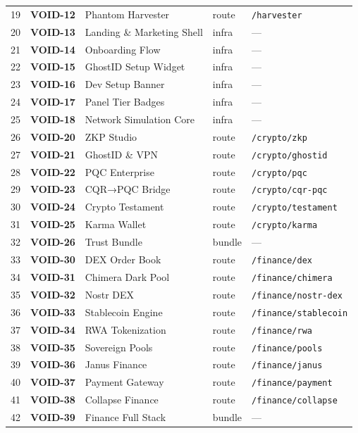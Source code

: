 \documentclass[10pt,a4paper,landscape]{article}
\begin{document}
\begin{longtable}{@{}rl p{4.2cm} p{1.4cm} p{3.8cm}@{}}
19 & \textbf{VOID-12} & Phantom Harvester & route & \texttt{/harvester} \\
20 & \textbf{VOID-13} & Landing \& Marketing Shell & infra & — \\
21 & \textbf{VOID-14} & Onboarding Flow & infra & — \\
22 & \textbf{VOID-15} & GhostID Setup Widget & infra & — \\
23 & \textbf{VOID-16} & Dev Setup Banner & infra & — \\
24 & \textbf{VOID-17} & Panel Tier Badges & infra & — \\
25 & \textbf{VOID-18} & Network Simulation Core & infra & — \\
26 & \textbf{VOID-20} & ZKP Studio & route & \texttt{/crypto/zkp} \\
27 & \textbf{VOID-21} & GhostID \& VPN & route & \texttt{/crypto/ghostid} \\
28 & \textbf{VOID-22} & PQC Enterprise & route & \texttt{/crypto/pqc} \\
29 & \textbf{VOID-23} & CQR→PQC Bridge & route & \texttt{/crypto/cqr-pqc} \\
30 & \textbf{VOID-24} & Crypto Testament & route & \texttt{/crypto/testament} \\
31 & \textbf{VOID-25} & Karma Wallet & route & \texttt{/crypto/karma} \\
32 & \textbf{VOID-26} & Trust Bundle & bundle & — \\
33 & \textbf{VOID-30} & DEX Order Book & route & \texttt{/finance/dex} \\
34 & \textbf{VOID-31} & Chimera Dark Pool & route & \texttt{/finance/chimera} \\
35 & \textbf{VOID-32} & Nostr DEX & route & \texttt{/finance/nostr-dex} \\
36 & \textbf{VOID-33} & Stablecoin Engine & route & \texttt{/finance/stablecoin} \\
37 & \textbf{VOID-34} & RWA Tokenization & route & \texttt{/finance/rwa} \\
38 & \textbf{VOID-35} & Sovereign Pools & route & \texttt{/finance/pools} \\
39 & \textbf{VOID-36} & Janus Finance & route & \texttt{/finance/janus} \\
40 & \textbf{VOID-37} & Payment Gateway & route & \texttt{/finance/payment} \\
41 & \textbf{VOID-38} & Collapse Finance & route & \texttt{/finance/collapse} \\
42 & \textbf{VOID-39} & Finance Full Stack & bundle & — \\

\end{longtable}
\end{document}
